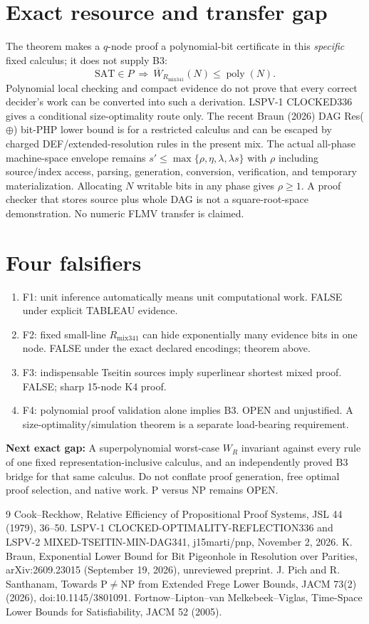 \documentclass[11pt]{article}
\begin{document}
\section*{Exact resource and transfer gap}
The theorem makes a $q$-node proof a polynomial-bit certificate in this \emph{specific} fixed calculus; it does not supply B3:
\[
\mathrm{SAT}\in P\ \Longrightarrow\ \overline W_{R_{\mathrm{mix341}}}(N)\le\operatorname{poly}(N).
\]
Polynomial local checking and compact evidence do not prove that every correct decider's work can be converted into such a derivation. LSPV-1 CLOCKED336 gives a conditional size-optimality route only. The recent Braun (2026) DAG Res($\oplus$) bit-PHP lower bound is for a restricted calculus and can be escaped by charged DEF/extended-resolution rules in the present mix. The actual all-phase machine-space envelope remains $s'\le\max\{\rho,\eta,\lambda,\lambda s\}$ with $\rho$ including source/index access, parsing, generation, conversion, verification, and temporary materialization. Allocating $N$ writable bits in any phase gives $\rho\ge1$. A proof checker that stores source plus whole DAG is not a square-root-space demonstration. No numeric FLMV transfer is claimed.
\section*{Four falsifiers}
\begin{enumerate}
\item[] F1: unit inference automatically means unit computational work. FALSE under explicit TABLEAU evidence.
\item[] F2: fixed small-line $R_{\mathrm{mix341}}$ can hide exponentially many evidence bits in one node. FALSE under the exact declared encodings; theorem above.
\item[] F3: indispensable Tseitin sources imply superlinear shortest mixed proof. FALSE; sharp 15-node K4 proof.
\item[] F4: polynomial proof validation alone implies B3. OPEN and unjustified. A size-optimality/simulation theorem is a separate load-bearing requirement.
\end{enumerate}
\noindent\textbf{Next exact gap:} A superpolynomial worst-case $W_R$ invariant against every rule of one fixed representation-inclusive calculus, and an independently proved B3 bridge for that same calculus. Do not conflate proof generation, free optimal proof selection, and native work. P versus NP remains OPEN.
\begin{thebibliography}{9}
 Cook--Reckhow, Relative Efficiency of Propositional Proof Systems, JSL 44 (1979), 36--50.
 LSPV-1 CLOCKED-OPTIMALITY-REFLECTION336 and LSPV-2 MIXED-TSEITIN-MIN-DAG341, j15marti/pnp, November 2, 2026.
 K. Braun, Exponential Lower Bound for Bit Pigeonhole in Resolution over Parities, arXiv:2609.23015 (September 19, 2026), unreviewed preprint.
 J. Pich and R. Santhanam, Towards P$\ne$NP from Extended Frege Lower Bounds, JACM 73(2) (2026), doi:10.1145/3801091.
 Fortnow--Lipton--van Melkebeek--Viglas, Time-Space Lower Bounds for Satisfiability, JACM 52 (2005).
\end{thebibliography}
\end{document}
